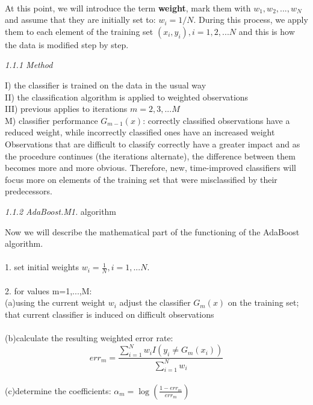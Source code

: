 \documentclass[12pt, letterpaper, twoside]{article}
\begin{document}
\\
At this point, we will introduce the term \textbf{weight}, mark them with $w_1, w_2,...,w_N$ and assume that they are initially set to: $w_i=1/N$. 
During this process, we apply them to each element of the training set $(x_i,y_i), i=1,2,...N$ and this is how the data is modified step by step.
\begin{center}
\large{\emph{1.1.1 Method}}
\end{center}
I) the classifier is trained on the data in the usual way\\
II) the classification algorithm is applied to weighted observations\\
III) previous applies to iterations $m=2,3,...M$\\
M) classifier performance $G_{m-1}(x)$: correctly classified observations have a reduced weight, while incorrectly classified ones have an increased weight 
\\ Observations that are difficult to classify correctly have a greater impact and as the procedure continues (the iterations alternate), the difference between them becomes more and more obvious. Therefore, new, time-improved classifiers will focus more on elements of the training set that were misclassified by their predecessors.
\begin{center}
\large{\emph{1.1.2 AdaBoost.M1.} algorithm}\\
\end{center}
Now we will describe the mathematical part of the functioning of the AdaBoost algorithm.\\\\
1. set initial weights $w_i=\frac{1}{N},i=1,...N$.\\\\
2. for values m=1,...,M:\\
\hspace*{4ex}(a)\space using the current weight $w_i$ adjust the classifier $G_m(x)$ on the training set; that current classifier is induced on difficult observations\\\\
\hspace*{4ex}(b)\space calculate the resulting weighted error rate:
\begin{equation*}
err_m=\frac{\sum_{i=1}^N w_i I(y_i\neq G_m(x_i))}{\sum_{i=1}^N w_i}
\end{equation*}\\
\hspace*{4ex}(c)\space determine the coefficients: $\alpha_m=\log(\frac{1-err_m}{err_m})$\\\\
\end{document}
